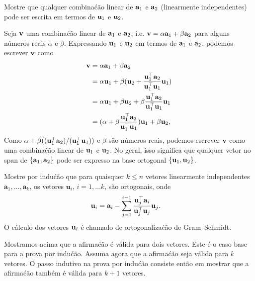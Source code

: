 \begin{exenumerate}
    \item Mostre que qualquer combina\'c\~ao linear de $\mathbf{a}_1$ e $\mathbf{a}_2$ (linearmente independentes) pode ser escrita em termos de $\mathbf{u}_1$ e $\mathbf{u}_2$. 
    \begin{solution}
        Seja $\mathbf{v}$ uma combina\'c\~ao linear de $\mathbf{a}_1$ e $\mathbf{a}_2$, i.e. $\mathbf{v} = \alpha{\mathbf{a}_1} + \beta{\mathbf{a}_2}$ para alguns n\'umeros reais $\alpha$ e $\beta$.
        Expressando $\mathbf{u}_1$ e $\mathbf{u}_2$ em termos de $\mathbf{a}_1$ e $\mathbf{a}_2$, podemos escrever $\mathbf{v}$ como
        \begin{align}
            \mathbf{v}  &= \alpha \mathbf{a}_1 + \beta\mathbf{a}_2 \\
            &= \alpha\mathbf{u}_1 + \beta(\mathbf{u}_2 + \frac{\mathbf{u}_1^\top\mathbf{a}_2}{\mathbf{u}_1^\top\mathbf{u}_1}\mathbf{u}_1) \\
            &= \alpha\mathbf{u}_1 + \beta\mathbf{u}_2 + \beta \frac{\mathbf{u}_1^\top\mathbf{a}_2}{\mathbf{u}_1^\top\mathbf{u}_1}\mathbf{u}_1 \\
            &= (\alpha + \beta\frac{\mathbf{u}_1^\top\mathbf{a}_2}{\mathbf{u}_1^\top\mathbf{u}_1})\mathbf{u}_1 + \beta\mathbf{u}_2,
        \end{align}
        Como $\alpha + \beta((\mathbf{u}_1^\top\mathbf{a}_2)/(\mathbf{u}_1^\top\mathbf{u}_1))$ e $\beta$ s\~ao n\'umeros
        reais, podemos escrever $\mathbf{v}$ como uma combina\'c\~ao linear de $\mathbf{u}_1$ e
        $\mathbf{u}_2$. No geral, isso significa que qualquer vetor no span de $\{\mathbf{a}_1, \mathbf{a}_2\}$
        pode ser expresso na base ortogonal $\{\mathbf{u}_1, \mathbf{u}_2\}$.
        
    \end{solution}
    
    \item Mostre por indu\'c\~ao que para quaisquer $k \le n$ vetores linearmente independentes
    $\mathbf{a}_1,\ldots,\mathbf{a}_k$, os vetores $\mathbf{u}_i$, $i=1, \ldots
    k$, s\~ao ortogonais, onde
    \begin{align}
        \mathbf{u}_i &= \mathbf{a}_i - \sum_{j=1}^{i-1} \frac{\mathbf{u}_j^\top \mathbf{a}_i}{\mathbf{u}_j^\top\mathbf{u}_j} \mathbf{u}_j. \label{eq:Gram-Schmidt-basis-def}
    \end{align}
    O c\'alculo dos vetores $\mathbf{u}_i$ \'e chamado de ortogonaliza\'c\~ao de Gram–Schmidt.
    \begin{solution}
        Mostramos acima que a afirma\'c\~ao \'e v\'alida para dois vetores. Este \'e o caso
        base para a prova por indu\'c\~ao. Assuma agora que a afirma\'c\~ao seja v\'alida para $k$
        vetores. O passo indutivo na prova por indu\'c\~ao consiste ent\~ao em
        mostrar que a afirma\'c\~ao tamb\'em \'e v\'alida para $k+1$ vetores.
        

\end{solution}
\end{exenumerate}
